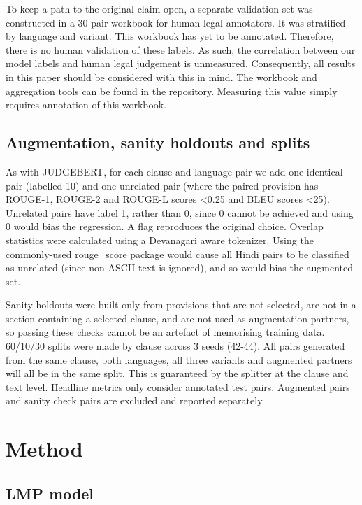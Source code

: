 \documentclass[conference]{IEEEtran}
\begin{document}
To keep a path to the original claim open, a separate validation set was constructed in a 30 pair workbook for human legal annotators. It was stratified by language and variant. This workbook has yet to be annotated. Therefore, there is no human validation of these labels. As such, the correlation between our model labels and human legal judgement is unmeasured. Consequently, all results in this paper should be considered with this in mind. The workbook and aggregation tools can be found in the repository. Measuring this value simply requires annotation of this workbook.

\subsection{Augmentation, sanity holdouts and splits}

As with JUDGEBERT, for each clause and language pair we add one identical pair (labelled 10) and one unrelated pair (where the paired provision has ROUGE-1, ROUGE-2 and ROUGE-L scores <0.25 and BLEU scores <25). Unrelated pairs have label 1, rather than 0, since 0 cannot be achieved and using 0 would bias the regression. A flag reproduces the original choice. Overlap statistics were calculated using a Devanagari aware tokenizer. Using the commonly-used rouge\_score package would cause all Hindi pairs to be classified as unrelated (since non-ASCII text is ignored), and so would bias the augmented set.

Sanity holdouts were built only from provisions that are not selected, are not in a section containing a selected clause, and are not used as augmentation partners, so passing these checks cannot be an artefact of memorising training data. 60/10/30 splits were made by clause across 3 seeds (42-44). All pairs generated from the same clause, both languages, all three variants and augmented partners will all be in the same split. This is guaranteed by the splitter at the clause and text level. Headline metrics only consider annotated test pairs. Augmented pairs and sanity check pairs are excluded and reported separately.

\section{Method}

\subsection{LMP model}
\end{document}

